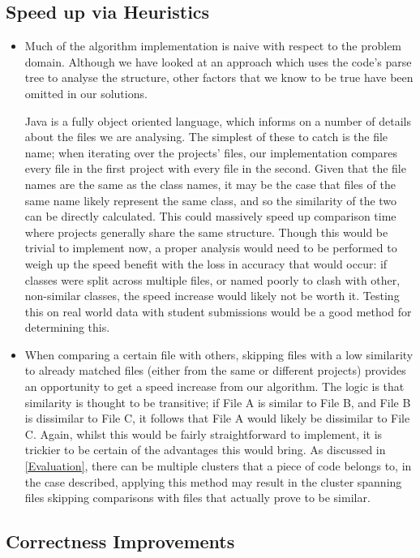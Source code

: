 \subsection{Speed up via Heuristics}
\begin{itemize}
\item
Much of the algorithm implementation is naive with respect to the problem domain.
Although we have looked at an approach which uses the code's parse tree to 
analyse the structure, other factors that we know to be true have been omitted
in our solutions. 

Java is a fully object oriented language, which informs on a number of details
about the files we are analysing. The simplest of these to catch is the file name;
when iterating over the projects' files, our implementation compares every file
in the first project with every file in the second. Given that the file names
are the same as the class names, it may be the case that files of the same name
likely represent the same class, and so the similarity of the two can be directly
calculated. This could massively speed up comparison time where projects generally
share the same structure. Though this would be trivial to implement now, a proper
analysis would need to be performed to weigh up the speed benefit with the loss in
accuracy that would occur: if classes were split across multiple files, or named
poorly to clash with other, non-similar classes, the speed increase would likely not
be worth it. Testing this on real world data with student submissions would be
a good method for determining this.

\item
When comparing a certain file with others, skipping files with a low similarity 
to already matched files (either from the same or different projects) provides
an opportunity to get a speed increase from our algorithm. The logic is that
similarity is thought to be transitive; if File A is similar to File B, and
File B is dissimilar to File C, it follows that File A would likely be dissimilar
to File C. Again, whilst this would be fairly straightforward to implement, it
is trickier to be certain of the advantages this would bring. As discussed in
\cref{Evaluation}, there can be multiple clusters that a piece of code belongs
to, in the case described, applying this method may result in the cluster
spanning files skipping comparisons with files that actually prove to be similar.
\end{itemize}

\subsection{Correctness Improvements}

